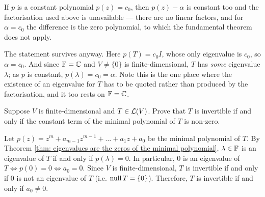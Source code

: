 \begin{ainote}
  If $p$ is a constant polynomial $p(z) = c_0$, then $p(z) - \alpha$ is constant too and the factorisation used above is unavailable --- there are no linear factors, and for $\alpha = c_0$ the difference is the zero polynomial, to which the fundamental theorem does not apply.

  The statement survives anyway. Here $p(T) = c_0 I$, whose only eigenvalue is $c_0$, so $\alpha = c_0$. And since $\mathbb{F} = \mathbb{C}$ and $V \neq \{0\}$ is finite-dimensional, $T$ has \emph{some} eigenvalue $\lambda$; as $p$ is constant, $p(\lambda) = c_0 = \alpha$. Note this is the one place where the existence of an eigenvalue for $T$ has to be quoted rather than produced by the factorisation, and it too rests on $\mathbb{F} = \mathbb{C}$.
\end{ainote}

\begin{xrcs}
  Suppose $V$ is finite-dimensional and $T \in \mathcal{L}(V)$. Prove that $T$ is invertible if and only if the constant term of the minimal polynomial of $T$ is non-zero.
\begin{xprf}
  Let $p(z) = z^m + a_{m-1}z^{m-1} + \dots + a_1 z + a_0$ be the minimal polynomial of $T$.
  By Theorem \ref{thm: eigenvalues are the zeros of the minimal polynomial}, $\lambda \in \mathbb{F}$ is an eigenvalue of $T$ if and only if $p(\lambda) = 0$.
  In particular, $0$ is an eigenvalue of $T \iff p(0) = 0 \iff a_0 = 0$.
  Since $V$ is finite-dimensional, $T$ is invertible if and only if $0$ is not an eigenvalue of $T$ (i.e. $\operatorname{null} T = \{0\}$).
  Therefore, $T$ is invertible if and only if $a_0 \neq 0$.
\end{xprf}
\end{xrcs}

